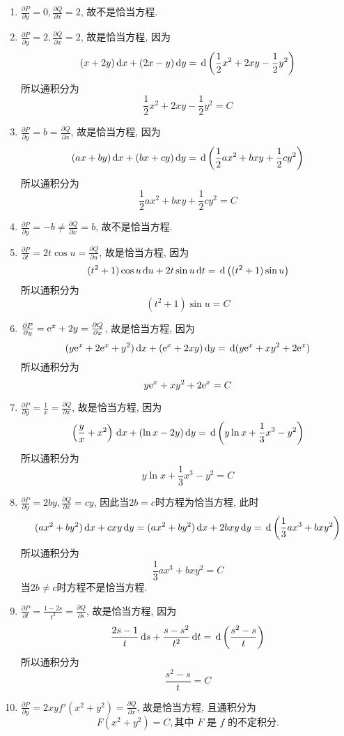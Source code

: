 \begin{solve}
	\begin{enumerate}[(1)]
		\item $\frac{\partial P}{\partial y}=0,\frac{\partial Q}{\partial x}=2$, 故不是恰当方程.
		\item $\frac{\partial P}{\partial y}=2,\frac{\partial Q}{\partial x}=2$, 故是恰当方程, 因为
			  \[(x+2y)\,\mathrm{d} x+(2x-y)\,\mathrm{d} y=\,\mathrm{d}\left(\frac{1}{2}x^2+2xy-\frac{1}{2}y^2\right)\]
			  所以通积分为
			  \[\frac{1}{2}x^2+2xy-\frac{1}{2}y^2=C\]
		\item $\frac{\partial P}{\partial y}=b=\frac{\partial Q}{\partial x}$, 故是恰当方程, 因为
			  \[(ax+by)\,\mathrm{d} x+(bx+cy)\,\mathrm{d} y=\,\mathrm{d}\left(\frac{1}{2}ax^2+bxy+\frac{1}{2}cy^2\right)\]
			  所以通积分为
			  \[\frac{1}{2}ax^2+bxy+\frac{1}{2}cy^2=C\]
		\item $\frac{\partial P}{\partial y}=-b\neq\frac{\partial Q}{\partial x}=b$, 故不是恰当方程.
		\item $\frac{\partial P}{\partial t}=2t\cos u=\frac{\partial Q}{\partial u}$, 故是恰当方程, 因为
			  \[(t^2+1)\cos u\,\mathrm{d} u+2t\sin u\,\mathrm{d} t=\,\mathrm{d}\left((t^2+1)\sin u\right)\]
			  所以通积分为
			  \[(t^2+1)\sin u=C\]
		\item $\frac{\partial P}{\partial y}=\mathrm{e}^x+2y=\frac{\partial Q}{\partial x}$, 故是恰当方程, 因为
			  \[(y\mathrm{e}^x+2\mathrm{e}^x+y^2)\,\mathrm{d} x+(\mathrm{e}^x+2xy)\,\mathrm{d} y=\,\mathrm{d}(y\mathrm{e}^x+xy^2+2\mathrm{e}^x)\]
			  所以通积分为
			  \[y\mathrm{e}^x+xy^2+2\mathrm{e}^x=C\]
		\item $\frac{\partial P}{\partial y}=\frac{1}{x}=\frac{\partial Q}{\partial x}$, 故是恰当方程, 因为
			  \[\left(\frac{y}{x}+x^2\right)\,\mathrm{d} x+(\ln x-2y)\,\mathrm{d} y=\,\mathrm{d}\left(y\ln x+\frac{1}{3}x^3-y^2\right)\]
			  所以通积分为
			  \[y\ln x+\frac{1}{3}x^3-y^2=C\]
		\item $\frac{\partial P}{\partial y}=2by,\frac{\partial Q}{\partial x}=cy$, 因此当$2b=c$时方程为恰当方程, 此时
			  \[(ax^2+by^2)\,\mathrm{d} x+cxy\,\mathrm{d} y=(ax^2+by^2)\,\mathrm{d} x+2bxy\,\mathrm{d} y=\,\mathrm{d}\left(\frac{1}{3}ax^3+bxy^2\right)\]
			  所以通积分为
			  \[\frac{1}{3}ax^3+bxy^2=C\]
			  当$2b\neq c$时方程不是恰当方程.
		\item $\frac{\partial P}{\partial t}=\frac{1-2s}{t^2}=\frac{\partial Q}{\partial s}$, 故是恰当方程, 因为
			  \[\frac{2s-1}{t}\,\mathrm{d} s+\frac{s-s^2}{t^2}\,\mathrm{d} t=\,\mathrm{d}\left(\frac{s^2-s}{t}\right)\]
			  所以通积分为
			  \[\frac{s^2-s}{t}=C\]
		\item $\frac{\partial P}{\partial y}=2xyf'(x^2+y^2)=\frac{\partial Q}{\partial x}$, 故是恰当方程, 且通积分为
			  \[F(x^2+y^2)=C,\text{其中\ }F\text{\ 是\ }f\text{\ 的不定积分}.\]
	\end{enumerate}
\end{solve}


